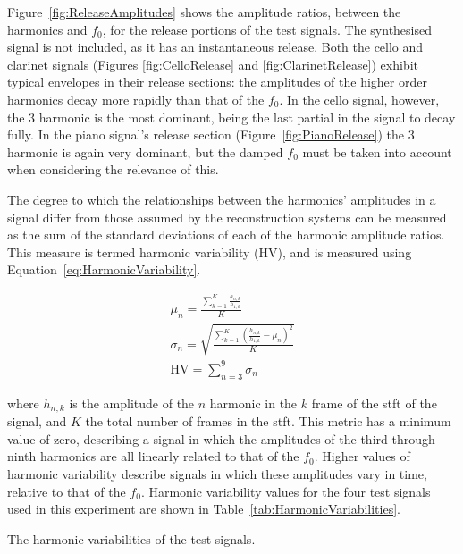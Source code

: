 		Figure~\ref{fig:ReleaseAmplitudes} shows the amplitude ratios, between the harmonics and $f_{0}$, for the
		release portions of the test signals. The synthesised signal is not included, as it has an instantaneous
		release. Both the cello and clarinet signals (Figures \ref{fig:CelloRelease} and \ref{fig:ClarinetRelease})
		exhibit typical envelopes in their release sections: the amplitudes of the higher order harmonics decay
		more rapidly than that of the $f_{0}$. In the cello signal, however, the 3 harmonic is the most
		dominant, being the last partial in the signal to decay fully. In the piano signal's release section
		(Figure~\ref{fig:PianoRelease}) the 3 harmonic is again very dominant, but the damped $f_{0}$
		must be taken into account when considering the relevance of this.

		The degree to which the relationships between the harmonics' amplitudes in a signal differ from those
		assumed by the reconstruction systems can be measured as the sum of the standard deviations of each of the
		harmonic amplitude ratios. This measure is termed harmonic variability ($\mathrm{HV}$), and is measured
		using Equation~\ref{eq:HarmonicVariability}. 		
		
		\begin{gather}
			\mu_{n} = \frac{\sum_{k = 1}^{K} \frac{h_{n,k}}{h_{1,k}}}{K} \nonumber \\[0.6em]
			\sigma_{n} = \sqrt{\frac{\sum_{k = 1}^{K} 
						 \left(\frac{h_{n,k}}{h_{1,k}} - \mu_{n} \right)^{2}}{K}} 
						 \nonumber \\[0.6em]
			\mathrm{HV} = \sum_{n = 3}^{9} \sigma_{n}
			\label{eq:HarmonicVariability}
		\end{gather}

		where $h_{n,k}$ is the amplitude of the $n$ harmonic in the $k$ frame of the
		\acrshort{stft} of the signal, and $K$ the total number of frames in the \acrshort{stft}. This metric has a
		minimum value of zero, describing a signal in which the amplitudes of the third through ninth harmonics are
		all linearly related to that of the $f_{0}$. Higher values of harmonic variability describe signals in
		which these amplitudes vary in time, relative to that of the $f_{0}$. Harmonic variability values for the
		four test signals used in this experiment are shown in Table~\ref{tab:HarmonicVariabilities}.

		\begin{table}[h!]
			\centering
			
			\caption{The harmonic variabilities of the test signals.}
			\label{tab:HarmonicVariabilities}
		\end{table}

